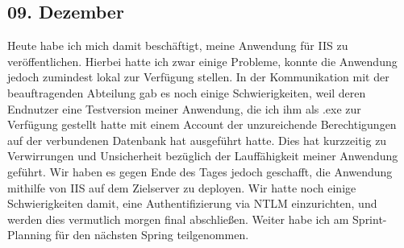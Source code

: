 \subsection{09. Dezember}
Heute habe ich mich damit beschäftigt, meine Anwendung für IIS zu veröffentlichen. Hierbei hatte ich zwar einige Probleme, konnte die Anwendung jedoch zumindest lokal zur Verfügung stellen. In der Kommunikation mit der beauftragenden Abteilung gab es noch einige Schwierigkeiten, weil deren Endnutzer eine Testversion meiner Anwendung, die ich ihm als .exe zur Verfügung gestellt hatte mit einem Account der unzureichende Berechtigungen auf der verbundenen Datenbank hat ausgeführt hatte. Dies hat kurzzeitig zu Verwirrungen und Unsicherheit bezüglich der Lauffähigkeit meiner Anwendung geführt. Wir haben es gegen Ende des Tages jedoch geschafft, die Anwendung mithilfe von IIS auf dem Zielserver zu deployen. Wir hatte noch einige Schwierigkeiten damit, eine Authentifizierung via NTLM einzurichten, und werden dies vermutlich morgen final abschließen. Weiter habe ich am Sprint-Planning für den nächsten Spring teilgenommen.